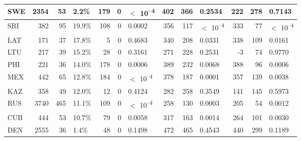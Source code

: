 \begin{tabular}{l|r|r|l|r|r|l|r|r|l|r|r|l}
\hline
SWE & 2354 & 53 & 2.2\% & 179 & 0 & $<$ 10\textsuperscript{--4} & 402 & 366 & 0.2534 & 222 & 278 & 0.7143\\
\hline
SRI & 382 & 95 & 19.9\% & 108 & 0 & 0.0002 & 356 & 117 & $<$ 10\textsuperscript{--4} & 333 & 77 & $<$ 10\textsuperscript{--4}\\
\hline
LAT & 171 & 37 & 17.8\% & 5 & 0 & 0.4683 & 340 & 208 & 0.0331 & 338 & 109 & 0.0161\\
\hline
LTU & 217 & 39 & 15.2\% & 28 & 0 & 0.3161 & 271 & 228 & 0.2531 & -3 & 74 & 0.9770\\
\hline
PHI & 221 & 36 & 14.0\% & 178 & 0 & 0.0006 & 389 & 232 & 0.0068 & 388 & 96 & 0.0006\\
\hline
MEX & 442 & 65 & 12.8\% & 184 & 0 & $<$ 10\textsuperscript{--4} & 378 & 187 & 0.0001 & 357 & 139 & 0.0038\\
\hline
KAZ & 358 & 49 & 12.0\% & 12 & 0 & 0.4124 & 282 & 258 & 0.3549 & 141 & 145 & 0.5973\\
\hline
RUS & 3740 & 465 & 11.1\% & 109 & 0 & $<$ 10\textsuperscript{--4} & 258 & 130 & 0.0003 & 205 & 54 & 0.0012\\
\hline
CUB & 444 & 53 & 10.7\% & 79 & 0 & 0.0058 & 317 & 163 & 0.0014 & 264 & 101 & 0.0030\\
\hline
DEN & 2555 & 36 & 1.4\% & 48 & 0 & 0.1498 & 472 & 465 & 0.4543 & 440 & 299 & 0.1189\\
\hline
\end{tabular}
